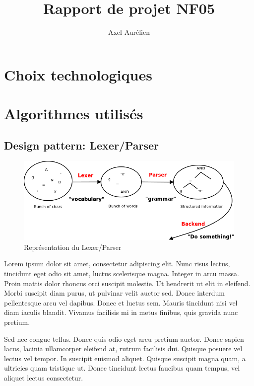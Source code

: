 \documentclass{report}
\title{Rapport de projet NF05}
\author{Axel \bsc{Mousset} Aurélien \bsc{Labate}}
\begin{document}
    \maketitle

    \chapter{Choix technologiques}
    \chapter{Algorithmes utilisés}
        \section{Design pattern: Lexer/Parser}
            \begin{figure}[h]
                \begin{center}
                    \includegraphics[scale=0.6]{./assets/lexer_parser.png}
                \end{center}

                \caption{Représentation du Lexer/Parser}
                \label{Représentation du Lexer/Parser}
            \end{figure}

            Lorem ipsum dolor sit amet, consectetur adipiscing elit. Nunc risus lectus, tincidunt eget odio sit amet, luctus scelerisque magna. Integer in arcu massa. Proin mattis dolor rhoncus orci suscipit molestie. Ut hendrerit ut elit in eleifend. Morbi suscipit diam purus, ut pulvinar velit auctor sed. Donec interdum pellentesque arcu vel dapibus. Donec et luctus sem. Mauris tincidunt nisi vel diam iaculis blandit. Vivamus facilisis mi in metus finibus, quis gravida nunc pretium.

            Sed nec congue tellus. Donec quis odio eget arcu pretium auctor. Donec sapien lacus, lacinia ullamcorper eleifend at, rutrum facilisis dui. Quisque posuere vel lectus vel tempor. In suscipit euismod aliquet. Quisque suscipit magna quam, a ultricies quam tristique ut. Donec tincidunt lectus faucibus quam tempus, vel aliquet lectus consectetur.
\end{document}
